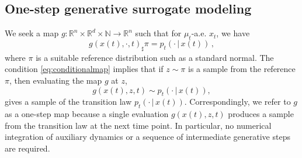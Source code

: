 \documentclass[oneside,11pt]{article}
\theoremstyle{remark}
\newcommand{\R}{\mathbb{R}}
\begin{document}
\subsection{One-step generative surrogate modeling}
We seek a
    map  $g: \R^n \times \R^d \times \mathbb{N} \to \R^n$ such that for $\mu_t$-a.e. $x_t$, we have
    \begin{equation}\label{eq:conditionalmap}
        g(x(t),\cdot,t)_{\sharp}\pi
        =
        p_t(\cdot\,|\,x(t))\,,
    \end{equation}
    where $\pi$ is a suitable reference distribution such as a standard normal. 
The condition \eqref{eq:conditionalmap} implies that if $z\sim\pi$ is a sample from the reference $\pi$, then evaluating the map $g$ at $z$,
    \[
        g(x(t),z,t) \sim p_t(\cdot\,|\,x(t)),
    \]
    gives a sample of the transition law $p_t(\cdot \,|\, x(t))$. 
Correspondingly, we refer to $g$ as a one-step map because a single evaluation $g(x(t),z,t)$ produces a sample from the transition law at the next time point. In particular, no numerical integration of auxiliary dynamics or a sequence of intermediate generative steps are required.
\end{document}
